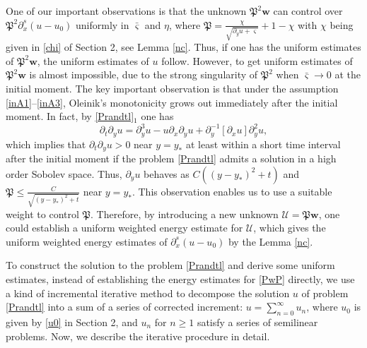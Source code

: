 \documentclass{amsart}
\numberwithin{equation}{section}
\begin{document}
One of our important observations is that the unknown $\mathfrak{P}^{2}\mathbf{w}$ can  control  over $\mathfrak{P}^{2}\partial_{x}^{s}(u-u_{0})$ uniformly in $\bar{\varsigma}$ and $\eta$, where $\mathfrak{P}=\frac{\chi}{\sqrt{\partial_{y}u+\varsigma}}+1-\chi$ with $\chi$ being given in \eqref{chi} of Section 2, see Lemma \ref{nc}. Thus, if one has the uniform estimates of $\mathfrak{P}^{2}\mathbf{w}$, the uniform estimates of $u$ follow. However, to get uniform estimates of $\mathfrak{P}^{2}\mathbf{w}$ is almost impossible, due to the strong singularity of $\mathfrak{P}^{2}$ when $\bar{\varsigma}\to 0$ at the initial moment. The key important observation is that under the assumption \eqref{inA1}--\eqref{inA3}, Oleinik's monotonicity grows out immediately after the initial moment. In fact, by \eqref{Prandtl}$_{1}$ one has
$$
\partial_{t}\partial_{y}u=\partial^{3}_{y}u-u\partial_{x}\partial_{y}u+\partial_{y}^{-1}[\partial_{x}u]\partial_{y}^{2}u,
$$
which implies that $\partial_{t}\partial_{y}u>0$ near $y=y_{*}$ at least within a short time interval after the initial moment if the problem \eqref{Prandtl} admits a solution in a high order Sobolev space. Thus, $\partial_{y}u$ behaves as $C((y-y_{*})^{2}+t)$ and $\mathfrak{P}\leq \frac{C}{\sqrt{(y-y_{*})^{2}+t}}$ near $y=y_{*}$. This observation enables us to use a suitable weight to control $\mathfrak{P}$. Therefore, by introducing a new unknown $\mathcal{U}=\mathfrak{P}\mathbf{w}$, one could establish a uniform weighted energy estimate for $\mathcal{U}$, which gives the uniform weighted energy estimates of $\partial_{x}^{s}(u-u_{0})$ by the Lemma \ref{nc}.

To construct the solution to the problem \eqref{Prandtl} and derive some uniform estimates, instead of establishing the energy estimates for \eqref{PwP} directly, we use a kind of incremental iterative method to decompose the solution $u$ of problem \eqref{Prandtl} into a sum of a series of corrected increment:
$u=\sum_{n=0}^{\infty}u_{n}$, where $u_{0}$ is given by \eqref{u0} in Section 2, and $u_{n}$ for $n\ge 1$ satisfy a series of semilinear problems. Now, we describe the iterative procedure in detail.
\end{document}
